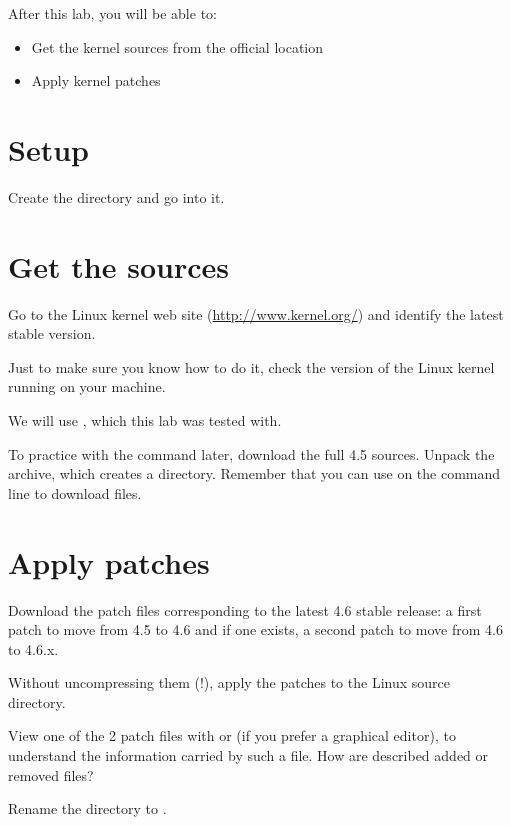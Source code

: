 
After this lab, you will be able to:
\begin{itemize}
\item Get the kernel sources from the official location
\item Apply kernel patches
\end{itemize}

\section{Setup}

Create the  directory and go into it.

\section{Get the sources}

Go to the Linux kernel web site (\url{http://www.kernel.org/}) and
identify the latest stable version.

Just to make sure you know how to do it, check the version of the
Linux kernel running on your machine.

We will use , which this lab was tested with.

To practice with the  command later, download the full 4.5
sources. Unpack the archive, which creates a 
directory. Remember that you can use  on the command
line to download files.

\section{Apply patches}

Download the patch files corresponding to the latest 4.6 stable
release: a first patch to move from 4.5 to 4.6 and if one exists,
a second patch to move from 4.6 to 4.6.x.

Without uncompressing them (!), apply the patches to the Linux
source directory.

View one of the 2 patch files with  or 
(if you prefer a graphical editor), to understand the information carried
by such a file. How are described added or removed files?

Rename the  directory to .
